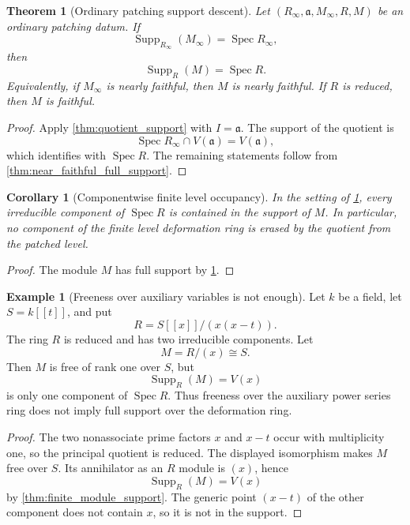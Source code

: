 \documentclass[11pt]{amsart}
\newtheorem{theorem}{Theorem}[section]
\newtheorem{corollary}[corollary]{Corollary}
\theoremstyle{definition}
\newtheorem{example}[example]{Example}
\theoremstyle{remark}
\newcommand{\Spec}{\operatorname{Spec}}
\newcommand{\Supp}{\operatorname{Supp}}
\newcommand{\fraka}{\mathfrak a}
\begin{document}
\begin{theorem}[Ordinary patching support descent]\label{thm:ordinary_support_descent}
Let \((R_\infty,\fraka,M_\infty,R,M)\) be an ordinary patching datum. If
\[
\Supp_{R_\infty}(M_\infty)=\Spec R_\infty,
\]
then
\[
\boxed{
\Supp_R(M)=\Spec R.
}
\]
Equivalently, if \(M_\infty\) is nearly faithful, then \(M\) is nearly faithful. If \(R\) is reduced, then \(M\) is faithful.
\end{theorem}

\begin{proof}
Apply \cref{thm:quotient_support} with \(I=\fraka\). The support of the quotient is
\[
\Spec R_\infty\cap V(\fraka)=V(\fraka),
\]
which identifies with \(\Spec R\). The remaining statements follow from
\cref{thm:near_faithful_full_support}.
\end{proof}

\begin{corollary}[Componentwise finite level occupancy]\label{cor:componentwise_occupancy}
In the setting of \cref{thm:ordinary_support_descent}, every irreducible component of
\(\Spec R\) is contained in the support of \(M\). In particular, no component of the finite level deformation ring is erased by the quotient from the patched level.
\end{corollary}

\begin{proof}
The module \(M\) has full support by \cref{thm:ordinary_support_descent}.
\end{proof}

\begin{example}[Freeness over auxiliary variables is not enough]\label{ex:freeness_not_support}
Let \(k\) be a field, let \(S=k[[t]]\), and put
\[
R=S[[x]]/(x(x-t)).
\]
The ring \(R\) is reduced and has two irreducible components. Let
\[
M=R/(x)\cong S.
\]
Then \(M\) is free of rank one over \(S\), but
\[
\Supp_R(M)=V(x)
\]
is only one component of \(\Spec R\). Thus freeness over the auxiliary power series ring does not imply full support over the deformation ring.
\end{example}

\begin{proof}
The two nonassociate prime factors \(x\) and \(x-t\) occur with multiplicity one, so the principal quotient is reduced. The displayed isomorphism makes \(M\) free over \(S\). Its annihilator as an \(R\) module is \((x)\), hence
\[
\Supp_R(M)=V(x)
\]
by \cref{thm:finite_module_support}. The generic point \((x-t)\) of the other component does not contain \(x\), so it is not in the support.
\end{proof}
\end{document}
